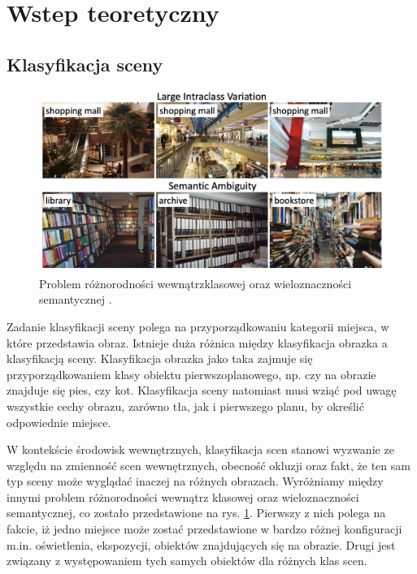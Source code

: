 \newpage %
\section{Wstep teoretyczny}


\subsection{Klasyfikacja sceny}
\begin{figure}[ht!]
    \includegraphics[width=\textwidth]{img/scene_class.png}
    \caption{Problem różnorodności wewnątrzklasowej oraz wieloznaczności semantycznej \cite{zeng2021deep}.}
    \label{fig:scene-class}
\end{figure}

Zadanie klasyfikacji sceny polega na przyporządkowaniu kategorii miejsca, w które przedstawia obraz. Istnieje duża różnica między klasyfikacja obrazka a klasyfikacją sceny. Klasyfikacja obrazka jako taka zajmuje się przyporządkowaniem klasy obiektu pierwszoplanowego, np. czy na obrazie znajduje się pies, czy kot. Klasyfikacja sceny natomiast musi wziąć pod uwagę wszystkie cechy obrazu, zarówno tła, jak i pierwszego planu, by określić odpowiednie miejsce. 

W kontekście środowisk wewnętrznych, klasyfikacja scen stanowi wyzwanie ze względu na zmienność scen wewnętrznych, obecność okluzji oraz fakt, że ten sam typ sceny może wyglądać inaczej na różnych obrazach. Wyróżniamy między innymi problem różnorodności wewnątrz klasowej oraz wieloznaczności semantycznej, co zostało przedstawione na rys. \ref{fig:scene-class}. Pierwszy z nich polega na fakcie, iż jedno miejsce może zostać przedstawione w bardzo różnej konfiguracji m.in. oświetlenia, ekspozycji, obiektów znajdujących się na obrazie. Drugi jest związany z występowaniem tych samych obiektów dla różnych klas scen.

